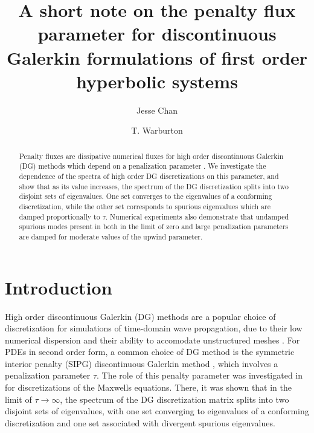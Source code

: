 \documentclass[preprint,10pt]{elsarticle}
\date{}
\newcommand{\note}[1]{{\color{blue}#1}}
\begin{document}
\begin{frontmatter}
\title{A short note on the penalty flux parameter for \note{discontinuous Galerkin formulations of first order hyperbolic systems}}

\author[rice]{Jesse Chan}
\author[vt]{T. Warburton}
\address[rice]{Department of Computational and Applied Mathematics, Rice University, 6100 Main St, Houston, TX, 77005}
\address[vt]{Department of Mathematics, Virginia Tech, 225 Stanger Street, Blacksburg, VA 24061-0123}

\address{}

\begin{abstract}
Penalty fluxes are dissipative numerical fluxes for high order discontinuous Galerkin (DG) methods which depend on a penalization parameter \cite{warburton2013low, ye2016discontinuous}.  We investigate the dependence of the spectra of high order DG discretizations on this parameter, and show that as its value increases, the \note{spectrum} of the DG discretization splits into two disjoint sets of eigenvalues.  One set converges to the eigenvalues of a conforming discretization, while the other set corresponds to spurious eigenvalues which are damped proportionally to $\tau$.  Numerical experiments also demonstrate that undamped spurious modes present in both in the limit of zero and large penalization parameters are damped for moderate values of the upwind parameter.  
\end{abstract}
\end{frontmatter}


\section{Introduction}

High order discontinuous Galerkin (DG) methods are a popular choice of discretization for simulations of time-domain wave propagation, due to their low numerical dispersion and their ability to accomodate unstructured meshes \cite{grote2006discontinuous,hesthaven2007nodal}.  For PDEs in second order form, a common choice of DG method is the symmetric interior penalty (SIPG) discontinuous Galerkin method \cite{riviere2008discontinuous}, which involves a penalization parameter $\tau$.  The role of this penalty parameter was investigated in \cite{Warburton20063205} for discretizations of the Maxwells equations.  There, it was shown that in the limit of $\tau\rightarrow\infty$, the \note{spectrum} of the DG discretization matrix splits into two disjoint sets of eigenvalues, with one set converging to eigenvalues of a conforming discretization and one set associated with divergent spurious eigenvalues.  
\end{document}
